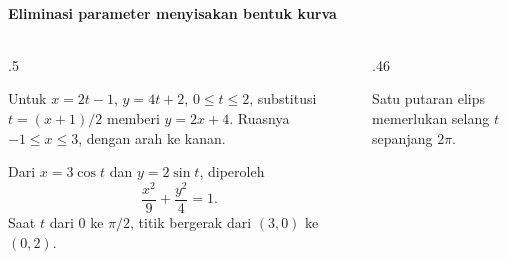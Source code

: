 \documentclass{../../kalkulus-ppt}
\newcommand{\sumbubidang}[4]{%
    \draw[sumbu] (#1,0) -- (#2,0) node[right,font=\scriptsize] {$x$};
    \draw[sumbu] (0,#3) -- (0,#4) node[above,font=\scriptsize] {$y$};
}
\begin{document}
\begin{frame}{\insertsection}
    \framesubtitle{Eliminasi parameter menyisakan bentuk kurva}
    \begin{columns}[c,onlytextwidth]
        \begin{column}{.5\textwidth}
            \begin{contoh}
                Untuk $x=2t-1$, $y=4t+2$, $0\le t\le2$,
                substitusi $t=(x+1)/2$ memberi $y=2x+4$.
                Ruasnya $-1\le x\le3$, dengan arah ke kanan.
            \end{contoh}
            \begin{contoh}[Elips]
                Dari $x=3\cos t$ dan $y=2\sin t$, diperoleh
                \[
                    \frac{x^2}{9}+\frac{y^2}{4}=1.
                \]
                Saat $t$ dari $0$ ke $\pi/2$, titik bergerak
                dari $(3,0)$ ke $(0,2)$.
            \end{contoh}
        \end{column}
        \begin{column}{.46\textwidth}
            \centering
            \par
            \small Satu putaran elips memerlukan selang $t$ sepanjang $2\pi$.
        \end{column}
    \end{columns}
\end{frame}
\end{document}
